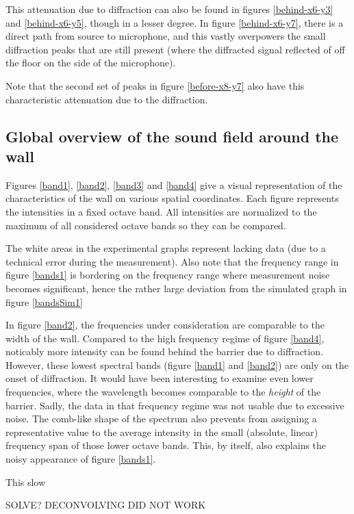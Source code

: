 This attenuation due to diffraction can also be found in figures \ref{behind-x6-y3} and \ref{behind-x6-y5}, though in a lesser degree. In figure \ref{behind-x6-y7}, there is a direct path from source to microphone, and this vastly overpowers the small diffraction peaks that are still present (where the diffracted signal reflected of off the floor on the side of the microphone).

Note that the second set of peaks in figure \ref{before-x8-y7} also have this characteristic attenuation due to the diffraction.




\subsection{Global overview of the sound field around the wall}
Figures \ref{band1}, \ref{band2}, \ref{band3} and \ref{band4} give a visual representation of the characteristics of the wall on various spatial coordinates. Each figure represents the intensities in a fixed octave band. All intensities are normalized to the maximum of all considered octave bands so they can be compared.

The white areas in the experimental graphs represent lacking data (due to a technical error during the measurement). Also note that the frequency range in figure \ref{bands1} is bordering on the frequency range where measurement noise becomes significant, hence the rather large deviation from the simulated graph in figure \ref{bandsSim1}

In figure \ref{band2}, the frequencies under consideration are comparable to the width of the wall. Compared to the high frequency regime of figure \ref{band4}, noticably more intensity can be found behind the barrier due to diffraction. However, these lowest spectral bands (figure \ref{band1} and \ref{band2}) are only on the onset of diffraction. It would have been interesting to examine even lower frequencies, where the wavelength becomes comparable to the \emph{height} of the barrier. Sadly, the data in that frequency regime was not usable due to excessive noise. The comb-like shape of the spectrum also prevents from assigning a representative value to the average intensity in the small (absolute, linear) frequency span of those lower octave bands. This, by itself, also explains the noisy appearance of figure \ref{bands1}.




This slow

SOLVE?
DECONVOLVING DID NOT WORK






